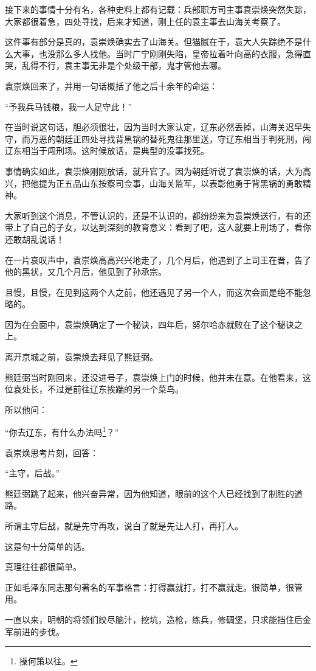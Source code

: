\begin{multicols}{\theparacolNo}
		接下来的事情十分有名，各种史料上都有记载：兵部职方司主事袁崇焕突然失踪，大家都很着急，四处寻找，后来才知道，刚上任的袁主事去山海关考察了。

		这件事有部分是真的，袁崇焕确实去了山海关。但猫腻在于，袁大人失踪绝不是什么大事，也没那么多人找他。当时广宁刚刚失陷，皇帝拉着叶向高的衣服，急得直哭，乱得不行，袁主事无非是个处级干部，鬼才管他去哪。

		袁崇焕回来了，并用一句话概括了他之后十余年的命运：

		“予我兵马钱粮，我一人足守此！”

		在当时说这句话，胆必须很壮，因为当时大家认定，辽东必然丢掉，山海关迟早失守，而万恶的朝廷正四处寻找背黑锅的替死鬼往那里送，守辽东相当于判死刑，闯辽东相当于闯刑场。这时候放话，是典型的没事找死。

		事情确实如此，袁崇焕刚刚放话，就升官了。因为朝廷听说了袁崇焕的话，大为高兴，把他提为正五品山东按察司佥事，山海关监军，以表彰他勇于背黑锅的勇敢精神。

		大家听到这个消息，不管认识的，还是不认识的，都纷纷来为袁崇焕送行，有的还带上了自己的子女，以达到深刻的教育意义：看到了吧，这人就要上刑场了，看你还敢胡乱说话！

		在一片哀叹声中，袁崇焕高高兴兴地走了，几个月后，他遇到了上司王在晋，告了他的黑状，又几个月后，他见到了孙承宗。

		且慢，且慢，在见到这两个人之前，他还遇见了另一个人，而这次会面是绝不能忽略的。

		因为在会面中，袁崇焕确定了一个秘诀，四年后，努尔哈赤就败在了这个秘诀之上。

		离开京城之前，袁崇焕去拜见了熊廷弼。

		熊廷弼当时刚回来，还没进号子，袁崇焕上门的时候，他并未在意。在他看来，这位袁处长，不过是前往辽东挨踹的另一个菜鸟。

		所以他问：

		“你去辽东，有什么办法吗\footnote{操何策以往。}？”

		袁崇焕思考片刻，回答：

		“主守，后战。”

		熊廷弼跳了起来，他兴奋异常，因为他知道，眼前的这个人已经找到了制胜的道路。

		所谓主守后战，就是先守再攻，说白了就是先让人打，再打人。

		这是句十分简单的话。

		真理往往都很简单。

		正如毛泽东同志那句著名的军事格言：打得赢就打，打不赢就走。很简单，很管用。

		一直以来，明朝的将领们绞尽脑汁，挖坑，造枪，练兵，修碉堡，只求能挡住后金军前进的步伐。


\end{multicols}
